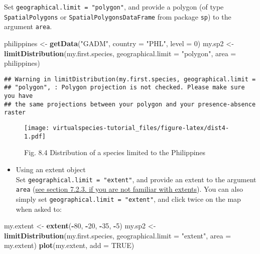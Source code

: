 \documentclass[]{article}
\newenvironment{Shaded}{\begin{snugshade}}{\end{snugshade}}
\newcommand{\KeywordTok}[1]{\textcolor[rgb]{0.13,0.29,0.53}{\textbf{#1}}}
\newcommand{\DataTypeTok}[1]{\textcolor[rgb]{0.13,0.29,0.53}{#1}}
\newcommand{\DecValTok}[1]{\textcolor[rgb]{0.00,0.00,0.81}{#1}}
\newcommand{\StringTok}[1]{\textcolor[rgb]{0.31,0.60,0.02}{#1}}
\newcommand{\OtherTok}[1]{\textcolor[rgb]{0.56,0.35,0.01}{#1}}
\newcommand{\OperatorTok}[1]{\textcolor[rgb]{0.81,0.36,0.00}{\textbf{#1}}}
\newcommand{\NormalTok}[1]{#1}
\providecommand{\tightlist}{%
  \setlength{\itemsep}{0pt}\setlength{\parskip}{0pt}}
\begin{document}
Set \texttt{geographical.limit\ =\ "polygon"}, and provide a polygon (of
type \texttt{SpatialPolygons} or \texttt{SpatialPolygonsDataFrame} from
package \texttt{sp}) to the argument \texttt{area}.

\begin{Shaded}
\begin{Highlighting}[]
\NormalTok{philippines <-}\StringTok{ }\KeywordTok{getData}\NormalTok{(}\StringTok{"GADM"}\NormalTok{, }\DataTypeTok{country =} \StringTok{"PHL"}\NormalTok{, }\DataTypeTok{level =} \DecValTok{0}\NormalTok{)}
\NormalTok{my.sp2 <-}\StringTok{ }\KeywordTok{limitDistribution}\NormalTok{(my.first.species, }
                            \DataTypeTok{geographical.limit =} \StringTok{"polygon"}\NormalTok{,}
                            \DataTypeTok{area =}\NormalTok{ philippines)}
\end{Highlighting}
\end{Shaded}

\begin{verbatim}
## Warning in limitDistribution(my.first.species, geographical.limit =
## "polygon", : Polygon projection is not checked. Please make sure you have
## the same projections between your polygon and your presence-absence raster
\end{verbatim}

\begin{figure}
\centering
\texttt{[image: virtualspecies-tutorial\_files/figure-latex/dist4-1.pdf]}
\caption{Fig. 8.4 Distribution of a species limited to the Philippines}
\end{figure}

\begin{itemize}
\tightlist
\item
  Using an extent object\\
  Set \texttt{geographical.limit\ =\ "extent"}, and provide an extent to
  the argument \texttt{area}
  (\protect\hyperlink{providing-an-extent-object}{see section 7.2.3. if
  you are not familiar with extents}). You can also simply set
  \texttt{geographical.limit\ =\ "extent"}, and click twice on the map
  when asked to:
\end{itemize}

\begin{Shaded}
\begin{Highlighting}[]
\NormalTok{my.extent <-}\StringTok{ }\KeywordTok{extent}\NormalTok{(}\OperatorTok{-}\DecValTok{80}\NormalTok{, }\OperatorTok{-}\DecValTok{20}\NormalTok{, }\OperatorTok{-}\DecValTok{35}\NormalTok{, }\OperatorTok{-}\DecValTok{5}\NormalTok{)}
\NormalTok{my.sp2 <-}\StringTok{ }\KeywordTok{limitDistribution}\NormalTok{(my.first.species, }
                            \DataTypeTok{geographical.limit =} \StringTok{"extent"}\NormalTok{,}
                            \DataTypeTok{area =}\NormalTok{ my.extent)}
\KeywordTok{plot}\NormalTok{(my.extent, }\DataTypeTok{add =} \OtherTok{TRUE}\NormalTok{)}
\end{Highlighting}
\end{Shaded}
\end{document}
